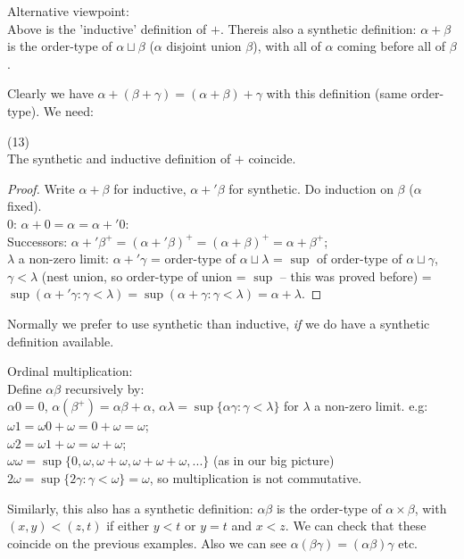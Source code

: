 \documentclass[a4paper]{article}
\begin{document}
Alternative viewpoint:\\
Above is the 'inductive' definition of $+$. Thereis also a synthetic definition: $\alpha+\beta$ is the order-type of $\alpha \sqcup \beta$ ($\alpha$ disjoint union $\beta$), with all of $\alpha$ coming before all of $\beta$.

Clearly we have $\alpha+(\beta+\gamma) = (\alpha+\beta)+\gamma$ with this definition (same order-type). We need:

\begin{prop} (13)\\
The synthetic and inductive definition of $+$ coincide.
\begin{proof}
Write $\alpha+\beta$ for inductive, $\alpha +' \beta$ for synthetic. Do induction on $\beta$ ($\alpha$ fixed).\\
$0$: $\alpha+0=\alpha=\alpha+'0$:\\
Successors: $\alpha+'\beta^+ = (\alpha+'\beta)^+ = (\alpha+\beta)^+=\alpha+\beta^+$;\\
$\lambda$ a non-zero limit: $\alpha+'\gamma$ = order-type of $\alpha \sqcup \lambda$ = $\sup$ of order-type of $\alpha\sqcup \gamma$, $\gamma <\lambda$ (nest union, so order-type of union = $\sup$ -- this was proved before) = $\sup(\alpha+'\gamma:\gamma<\lambda) = \sup(\alpha+\gamma:\gamma<\lambda) = \alpha+\lambda$.
\end{proof}
\end{prop}

Normally we prefer to use synthetic than inductive, \emph{if} we do have a synthetic definition available.

Ordinal multiplication:\\
Define $\alpha \beta$ recursively by:\\
$\alpha 0 = 0$, $\alpha(\beta^+) = \alpha\beta + \alpha$, $\alpha\lambda = \sup\{\alpha\gamma:\gamma <\lambda \}$ for $\lambda$ a non-zero limit. e.g:\\
$\omega 1 = \omega 0 + \omega = 0 + \omega = \omega$;\\
$\omega 2 = \omega 1 + \omega = \omega+\omega$;\\
$\omega\omega = \sup\{0,\omega,\omega+\omega,\omega+\omega+\omega,...\}$ (as in our big picture)\\
$2\omega = \sup\{2 \gamma:\gamma < \omega\} = \omega$, so multiplication is not commutative.

Similarly, this also has a synthetic definition: $\alpha\beta$ is the order-type of $\alpha\times\beta$, with $(x,y) < (z,t)$ if either $y<t$ or $y=t$ and $x<z$. We can check that these coincide on the previous examples. Also we can see $\alpha(\beta\gamma) = (\alpha\beta)\gamma$ etc.
\end{document}
